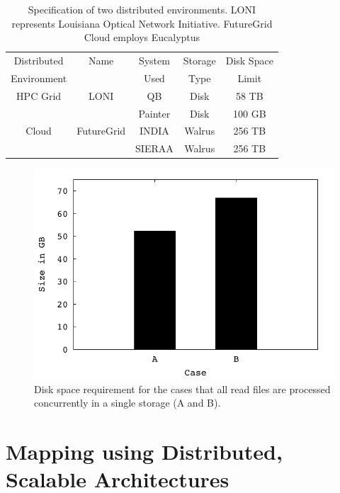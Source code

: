 \documentclass{acm_proc_article-sp}
\begin{document}
\begin{table}
\small
\begin{tabular}{|c|c|c|c|c|} 
\hline 
Distributed & Name & System &  Storage & Disk Space  \\
Environment & & Used & Type  &  Limit \\ \hline
HPC Grid & LONI & QB & Disk & 58 TB   \\
 &  &  Painter  & Disk &  100 GB  \\
Cloud & FutureGrid & INDIA & Walrus & 256 TB \\
&  &  SIERAA & Walrus & 256 TB \\  \hline
 \end{tabular}
\caption{Specification of two distributed environments. LONI represents Louisiana Optical Network Initiative\cite{loni}. FutureGrid Cloud\cite{futuregrid} employs Eucalyptus}
\label{table:two-systems} 
\end{table}


\begin{figure}
 \centering
 \includegraphics[scale=0.66]{figures/diskspace.pdf}
\caption{\small Disk space requirement for the cases that all read
  files are processed concurrently in a single storage (A and B). %
}
  \label{fig:diskspace} 
 \end{figure}


\section{Mapping using Distributed, Scalable Architectures}
\end{document}
